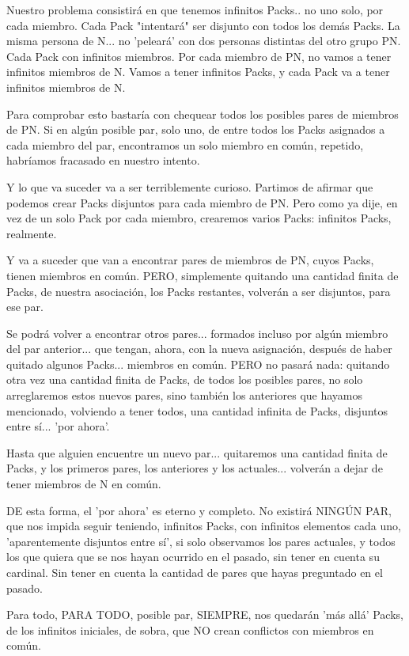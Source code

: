 Nuestro problema consistirá en que tenemos infinitos Packs.. no uno solo, por cada miembro. Cada Pack "intentará" ser disjunto con todos los demás Packs. La misma persona de N... no 'peleará' con dos personas distintas del otro grupo PN. Cada Pack con infinitos miembros. Por cada miembro de PN, no vamos a tener infinitos miembros de N. Vamos a tener infinitos Packs, y cada Pack va a tener infinitos miembros de N.

Para comprobar esto bastaría con chequear todos los posibles pares de miembros de PN. Si en algún posible par, solo uno, de entre todos los Packs asignados a cada miembro del par, encontramos un solo miembro en común, repetido, habríamos fracasado en nuestro intento.

Y lo que va suceder va a ser terriblemente curioso. Partimos de afirmar que podemos crear Packs disjuntos para cada miembro de PN. Pero como ya dije, en vez de un solo Pack por cada miembro, crearemos varios Packs: infinitos Packs, realmente.

Y va a suceder que van a encontrar pares de miembros de PN, cuyos Packs, tienen miembros en común. PERO, simplemente quitando una cantidad finita de Packs, de nuestra asociación, los Packs restantes, volverán a ser disjuntos, para ese par.

Se podrá volver a encontrar otros pares... formados incluso por algún miembro del par anterior... que tengan, ahora, con la nueva asignación, después de haber quitado algunos Packs... miembros en común. PERO no pasará nada: quitando otra vez una cantidad finita de Packs, de todos los posibles pares, no solo arreglaremos estos nuevos pares, sino también los anteriores que hayamos mencionado, volviendo a tener todos, una cantidad infinita de Packs, disjuntos entre sí... 'por ahora'.

Hasta que alguien encuentre un nuevo par... quitaremos una cantidad finita de Packs, y los primeros pares, los anteriores y los actuales... volverán a dejar de tener miembros de N en común. 

DE esta forma, el 'por ahora' es eterno y completo. No existirá NINGÚN PAR, que nos impida seguir teniendo, infinitos Packs, con infinitos elementos cada uno, 'aparentemente disjuntos entre sí', si solo observamos los pares actuales, y todos los que quiera que se nos hayan ocurrido en el pasado, sin tener en cuenta su cardinal. Sin tener en cuenta la cantidad de pares que hayas preguntado en el pasado.

Para todo, PARA TODO, posible par, SIEMPRE, nos quedarán 'más allá' Packs, de los infinitos iniciales, de sobra, que NO crean conflictos con miembros en común.


